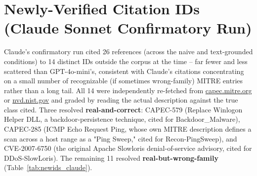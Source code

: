 \documentclass[twocolumn]{svjour3}
\begin{document}
\section{Newly-Verified Citation IDs (Claude Sonnet Confirmatory Run)}

Claude's confirmatory run cited 26 references (across the naive and text-grounded conditions)
to 14 distinct IDs outside the corpus at the time -- far fewer and less scattered than
GPT-4o-mini's, consistent with Claude's citations concentrating on a small number of recognizable
(if sometimes wrong-family) MITRE entries rather than a long tail. All 14 were independently
re-fetched from \url{capec.mitre.org} or \url{nvd.nist.gov} and graded by reading the actual
description against the true class cited. Three resolved \textbf{real-and-correct}: CAPEC-579
(Replace Winlogon Helper DLL, a backdoor-persistence technique, cited for Backdoor\_Malware),
CAPEC-285 (ICMP Echo Request Ping, whose own MITRE description defines a scan across a host range
as a "Ping Sweep," cited for Recon-PingSweep), and CVE-2007-6750 (the original Apache Slowloris
denial-of-service advisory, cited for DDoS-SlowLoris). The remaining 11 resolved
\textbf{real-but-wrong-family} (Table~\ref{tab:newids_claude}).
\end{document}
